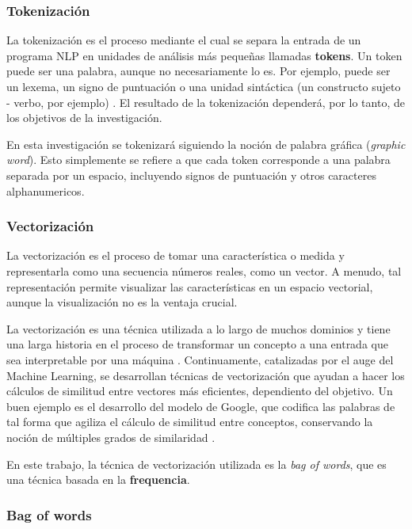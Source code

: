 \documentclass[12pt,letterpaper,twoside]{article}
\begin{document}
\subsubsection{Tokenización}
\label{sec:org2db9112}
La tokenización es el proceso mediante el cual se separa la entrada
de un programa NLP en unidades de análisis más pequeñas llamadas
\textbf{tokens}. Un token puede ser una palabra, aunque no necesariamente
lo es. Por ejemplo, puede ser un lexema, un signo de puntuación
o una unidad sintáctica (un constructo sujeto - verbo, por ejemplo)
\cite{manning1999foundations}. El resultado de la tokenización
dependerá, por lo tanto, de los objetivos de la investigación.

En esta investigación se tokenizará siguiendo la noción de
palabra gráfica (\emph{graphic word}). Esto simplemente se refiere
a que cada token corresponde a una palabra separada por un espacio,
incluyendo signos de puntuación y otros caracteres alphanumericos.




\subsubsection{Vectorización}
\label{sec:orge7117de}
La vectorización es el proceso de tomar una característica o medida
y representarla como una secuencia números reales, como un vector. A menudo,
tal representación permite visualizar las características en un espacio
vectorial, aunque la visualización no es la ventaja crucial.

La vectorización es una técnica utilizada a lo largo de muchos
dominios y tiene una larga historia en el proceso de transformar
un concepto a una entrada que sea interpretable por una máquina
\cite{jha_abhishek_vectorization}.  Continuamente, catalizadas por
el auge del Machine Learning, se desarrollan técnicas de
vectorización que ayudan a hacer los cálculos de similitud entre
vectores más eficientes, dependiento del objetivo. Un buen
ejemplo es el desarrollo del modelo de Google, que
codifica las palabras de tal forma que agiliza el cálculo
de similitud entre conceptos, conservando la noción
de múltiples grados de similaridad \cite{mikolov2013efficient}.

En este trabajo, la técnica de vectorización utilizada es
la \emph{bag of words}, que es una técnica basada en la \textbf{frequencia}.

\subsubsection{Bag of words}
\label{sec:org080183f}
\end{document}
